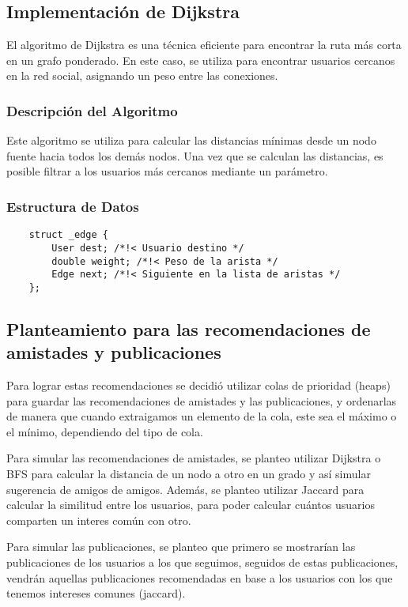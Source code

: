 \documentclass[9pt,letterpaper,onecolumn]{rho-class/rho}
\begin{document}
    \subsection{Implementación de Dijkstra}
    El algoritmo de Dijkstra es una técnica eficiente para encontrar la ruta más corta en un grafo ponderado.
    En este caso, se utiliza para encontrar usuarios cercanos en la red social, asignando un peso entre las conexiones. 

    \subsubsection{Descripción del Algoritmo}
    Este algoritmo se utiliza para calcular las distancias mínimas desde un nodo fuente hacia todos los demás nodos. 
    Una vez que se calculan las distancias, es posible filtrar a los usuarios más cercanos mediante un parámetro.

    \subsubsection{Estructura de Datos}
    \begin{verbatim}
    struct _edge {
        User dest; /*!< Usuario destino */
        double weight; /*!< Peso de la arista */
        Edge next; /*!< Siguiente en la lista de aristas */
    };
    \end{verbatim}


    \subsection{Planteamiento para las recomendaciones de amistades y publicaciones}

    Para lograr estas recomendaciones se decidió utilizar colas de prioridad (heaps) para guardar las recomendaciones de amistades y las publicaciones, y ordenarlas de manera que cuando extraigamos un elemento de la cola, este sea el máximo o el mínimo, dependiendo del tipo de cola.
    
    Para simular las recomendaciones de amistades, se planteo utilizar Dijkstra o BFS para calcular la distancia de un nodo a otro en un grado y así simular sugerencia de amigos de amigos. Además, se planteo utilizar Jaccard para calcular la similitud entre los usuarios, para poder calcular cuántos usuarios comparten un interes común con otro.

    Para simular las publicaciones, se planteo que primero se mostrarían las publicaciones de los usuarios a los que seguimos, seguidos de estas publicaciones, vendrán aquellas publicaciones recomendadas en base a los usuarios con los que tenemos intereses comunes (jaccard).
\end{document}
